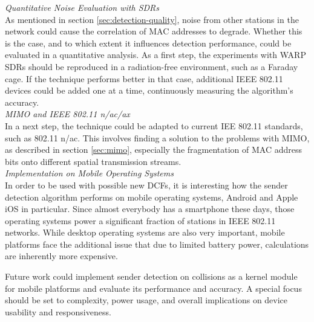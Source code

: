 \textit{Quantitative Noise Evaluation with SDRs}\\

As mentioned in section \ref{sec:detection-quality}, noise from other stations in the network could cause the correlation of \gls{MAC} addresses to degrade. Whether this is the case, and to which extent it influences detection performance, could be evaluated in a quantitative analysis. As a first step, the experiments with \gls{WARP} \glspl{SDR} should be reproduced in a radiation-free environment, such as a Faraday cage. If the technique performs better in that case, additional IEEE 802.11 devices could be added one at a time, continuously measuring the algorithm's accuracy.\\

\textit{MIMO and IEEE 802.11 n/ac/ax}\\

In a next step, the technique could be adapted to current IEE 802.11 standards, such as 802.11 n/ac. This involves finding a solution to the problems with \gls{MIMO}, as described in section \ref{sec:mimo}, especially the fragmentation of \gls{MAC} address bits onto different spatial transmission streams.\\

\textit{Implementation on Mobile Operating Systems}\\

In order to be used with possible new \glspl{DCF}, it is interesting how the sender detection algorithm performs on mobile operating systems, Android and Apple iOS in particular. Since almost everybody has a smartphone these days, those operating systems power a significant fraction of stations in IEEE 802.11 networks. While desktop operating systems are also very important, mobile platforms face the additional issue that due to limited battery power, calculations are inherently more expensive.

Future work could implement sender detection on collisions as a kernel module for mobile platforms and evaluate its performance and accuracy. A special focus should be set to complexity, power usage, and overall implications on device usability and responsiveness.
